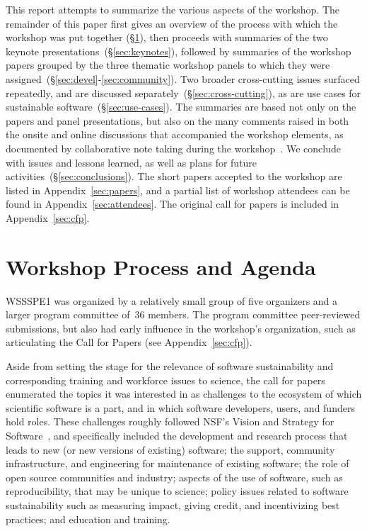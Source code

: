 \documentclass[11pt, oneside]{amsart}
\begin{document}
This report attempts to summarize the various aspects of the workshop.
The remainder of this paper first gives an overview of the process
with which the workshop was put together (\S\ref{sec:process}), then
proceeds with summaries of the two keynote
presentations~(\S\ref{sec:keynotes}), followed by summaries of the
workshop papers grouped by the three thematic workshop panels to which
they were assigned~(\S\ref{sec:devel}-\ref{sec:community}). Two
broader cross-cutting issues surfaced repeatedly, and are discussed
separately~(\S\ref{sec:cross-cutting}), as are use cases for
sustainable software~(\S\ref{sec:use-cases}). The summaries are based
not only on the papers and panel presentations, but also on the many
comments raised in both the onsite and online discussions that
accompanied the workshop elements, as documented by collaborative note
taking during the workshop~\cite{WSSSPE1-google-notes}. We conclude
with issues and lessons learned, as well as plans for future
activities~(\S\ref{sec:conclusions}).  The short papers accepted to
the workshop are listed in Appendix~\ref{sec:papers}, and a partial
list of workshop attendees can be found in
Appendix~\ref{sec:attendees}. The original call for papers is included in 
Appendix~\ref{sec:cfp}. 

\section{Workshop Process and Agenda} \label{sec:process}

WSSSPE1 was organized by a relatively small group of five organizers
and a larger program committee of~36 members. The program committee
peer-reviewed submissions, but also had early influence in the
workshop's organization, such as articulating the Call for Papers (see
Appendix~\ref{sec:cfp}).

Aside from setting the stage for the relevance of software
sustainability and corresponding training and workforce issues to
science, the call for papers enumerated the topics it was interested
in as challenges to the ecosystem of which scientific software is a
part, and in which software developers, users, and funders hold
roles. These challenges roughly followed NSF's Vision and Strategy for
Software~\cite{NSF_software_vision}, and specifically included the
development and research process that leads to new (or new versions of
existing) software; the support, community infrastructure, and
engineering for maintenance of existing software; the role of open
source communities and industry; aspects of the use of software, such
as reproducibility, that may be unique to science; policy issues
related to software sustainability such as measuring impact, giving
credit, and incentivizing best practices; and education and training.
\end{document}
